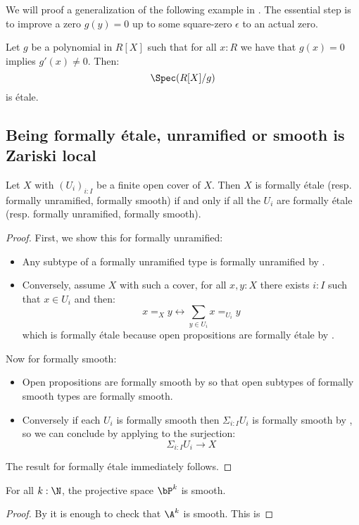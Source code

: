 We will proof a generalization of the following example in .
The essential step is to improve a zero $g(y)=0$ up to some square-zero $\epsilon$ to an actual zero.

\begin{example}
Let $g$ be a polynomial in $R[X]$ such that for all $x:R$ we have that $g(x)=0$ implies $g'(x)\not=0$. Then:
\[\Spec(R[X]/g)\]
is étale.
\end{example}


\subsection{Being formally étale, unramified or smooth is Zariski local}

\begin{lemma}\label{etale-zariski-local}
Let $X$ with $(U_i)_{i:I}$ be a finite open cover of $X$. Then $X$ is formally étale (resp. formally unramified, formally smooth) if and only if all the $U_i$ are formally étale (resp. formally unramified, formally smooth).
\end{lemma}

\begin{proof}
First, we show this for formally unramified:
\begin{itemize}
\item Any subtype of a formally unramified type is formally unramified by .
\item Conversely, assume $X$ with such a cover, for all $x,y:X$ there exists $i:I$ such that $x\in U_i$ and then:
\[x=_Xy \leftrightarrow \sum_{y\in U_i} x=_{U_i}y \]
which is formally étale because open propositions are formally étale by .
\end{itemize}
Now for formally smooth:
\begin{itemize}
\item Open propositions are formally smooth by  so that open subtypes of formally smooth types are formally smooth.
\item Conversely if each $U_i$ is formally smooth then $\Sigma_{i:I}U_i$ is formally smooth by , so we can conclude by applying  to the surjection:
\[\Sigma_{i:I}U_i \to X\]
\end{itemize}
The result for formally étale immediately follows.
\end{proof}

\begin{corollary}
For all $k:\N$, the projective space $\bP^k$ is smooth.
\end{corollary}

\begin{proof}
By  it is enough to check that $\A^k$ is smooth. This is 
\end{proof}





